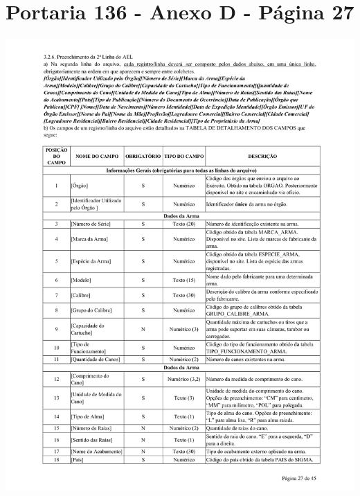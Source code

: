 \chapter{Portaria 136 - Anexo D - Página 27}
\includegraphics[scale=0.7]{imagens/AnexoA2-AnexoD-portaria-136}


